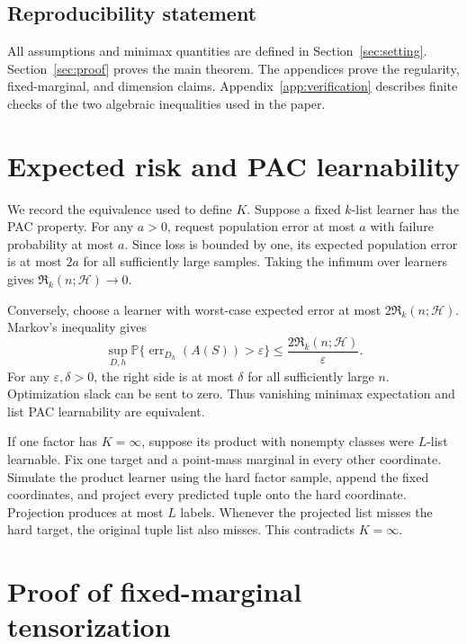 \documentclass{article}
\theoremstyle{definition}
\theoremstyle{remark}
\newcommand{\Pp}{\mathbb P}
\newcommand{\cH}{\mathcal H}
\newcommand{\Risk}{\mathfrak R}
\newcommand{\1}{\mathbf 1}
\begin{document}
\subsection*{Reproducibility statement}

All assumptions and minimax quantities are defined in Section~\ref{sec:setting}. Section~\ref{sec:proof} proves the main theorem. The appendices prove the regularity, fixed-marginal, and dimension claims. Appendix~\ref{app:verification} describes finite checks of the two algebraic inequalities used in the paper.




\appendix

\section{Expected risk and PAC learnability}
\label{app:pac}

We record the equivalence used to define \(K\). Suppose a fixed \(k\)-list learner has the PAC property. For any \(a>0\), request population error at most \(a\) with failure probability at most \(a\). Since loss is bounded by one, its expected population error is at most \(2a\) for all sufficiently large samples. Taking the infimum over learners gives \(\Risk_k(n;\cH)\to0\).

Conversely, choose a learner with worst-case expected error at most \(2\Risk_k(n;\cH)\). Markov's inequality gives \[ \sup_{D,h}\Pp\{\operatorname{err}_{D_h}(A(S))>\varepsilon\} \le\frac{2\Risk_k(n;\cH)}{\varepsilon}. \] For any \(\varepsilon,\delta>0\), the right side is at most \(\delta\) for all sufficiently large \(n\). Optimization slack can be sent to zero. Thus vanishing minimax expectation and list PAC learnability are equivalent.

If one factor has \(K=\infty\), suppose its product with nonempty classes were \(L\)-list learnable. Fix one target and a point-mass marginal in every other coordinate. Simulate the product learner using the hard factor sample, append the fixed coordinates, and project every predicted tuple onto the hard coordinate. Projection produces at most \(L\) labels. Whenever the projected list misses the hard target, the original tuple list also misses. This contradicts \(K=\infty\).

\section{Proof of fixed-marginal tensorization}
\label{app:fixed}
\end{document}
